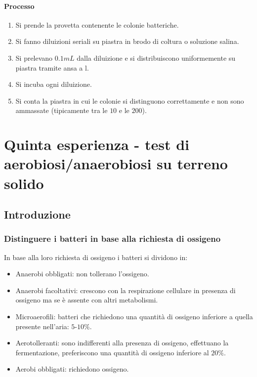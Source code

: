 			\paragraph{Processo}
			\begin{enumerate}
				\item Si prende la provetta contenente le colonie batteriche.
				\item Si fanno diluizioni seriali su piastra in brodo di coltura o soluzione salina.
				\item Si prelevano $0.1\si{mL}$ dalla diluizione e si distribuiscono uniformemente su piastra tramite ansa a l.
				\item Si incuba ogni diluizione.
				\item Si conta la piastra in cui le colonie si distinguono correttamente e non sono ammassate (tipicamente tra le $10$ e le $200$).
			\end{enumerate}

\section{Quinta esperienza - test di aerobiosi/anaerobiosi su terreno solido}

	\subsection{Introduzione}

		\subsubsection{Distinguere i batteri in base alla richiesta di ossigeno}
		In base alla loro richiesta di ossigeno i batteri si dividono in:
		\begin{multicols}{2}
			\begin{itemize}
				\item Anaerobi obbligati: non tollerano l'ossigeno.
				\item Anaerobi facoltativi: crescono con la respirazione cellulare in presenza di ossigeno ma se \`e assente con altri metabolismi.
				\item Microaerofili: batteri che richiedono una quantit\`a di ossigeno inferiore a quella presente nell'aria: $5$-$10\%$.
				\item Aerotolleranti: sono indifferenti alla presenza di ossigeno, effettuano la fermentazione, preferiscono una quantit\`a di ossigeno inferiore al $20\%$.
				\item Aerobi obbligati: richiedono ossigeno.
			\end{itemize}
		\end{multicols}

